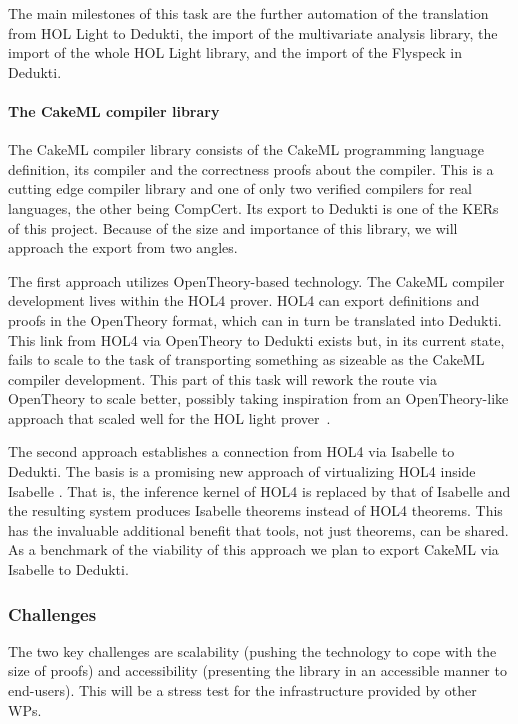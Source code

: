 The main milestones of this task are the further automation of the translation
from {HOL Light} to {Dedukti}, the import of the multivariate
analysis library, the import of the whole {HOL Light} library, and the
import of the {Flyspeck} in {Dedukti}.

\paragraph*{The CakeML compiler library}
The CakeML compiler library consists of the CakeML programming language
definition, its compiler and the correctness proofs about the
compiler. This is a cutting edge compiler library and one of only two
verified compilers for real languages, the other being CompCert. Its
export to Dedukti is one of the KERs of this project. Because of the
size and importance of this library, we will approach the export from
two angles.

The first approach utilizes OpenTheory-based technology. The CakeML
compiler development lives within the HOL4 prover. HOL4 can export
definitions and proofs in the OpenTheory format, which can in turn be
translated into Dedukti. This link from HOL4 via OpenTheory to Dedukti
exists but, in its current state, fails to scale to the task of
transporting something as sizeable as the CakeML compiler
development. This part of this task will rework the route via
OpenTheory to scale better, possibly taking inspiration from an
OpenTheory-like approach that scaled well for the HOL light
prover~\cite{KaliszykK13}.

The second approach establishes a connection from HOL4 via Isabelle to
Dedukti. The basis is a promising new approach of virtualizing HOL4
inside Isabelle \cite{ImmlerRW19}. That is, the inference
kernel of HOL4 is replaced by that of Isabelle and the resulting
system produces Isabelle theorems instead of HOL4 theorems. This has
the invaluable additional benefit that tools, not just theorems, can
be shared. As a benchmark of the viability of this approach we plan to
export CakeML via Isabelle to Dedukti.

\subsubsection*{Challenges}

The two key challenges are scalability (pushing the technology to cope
with the size of proofs) and accessibility (presenting the library in
an accessible manner to end-users). This will be a stress test for the
infrastructure provided by other WPs.


